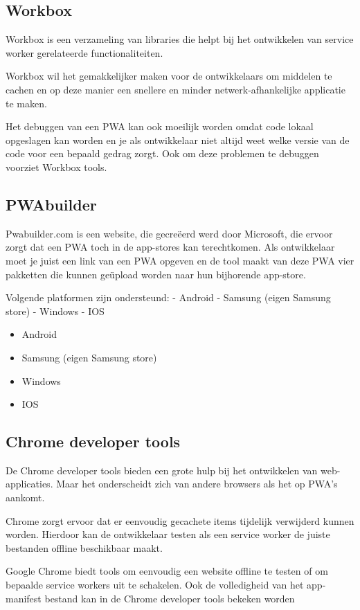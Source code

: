 		

\subsection{Workbox}

	Workbox is een verzameling van libraries die helpt bij het ontwikkelen van service worker gerelateerde functionaliteiten.
	
	Workbox wil het gemakkelijker maken voor de ontwikkelaars om middelen te cachen en op deze manier een snellere en minder netwerk-afhankelijke applicatie te maken.
	
	Het debuggen van een PWA kan ook moeilijk worden omdat code lokaal opgeslagen kan worden en je als ontwikkelaar niet altijd weet welke versie van de code voor een bepaald gedrag zorgt. Ook om deze problemen te debuggen voorziet Workbox tools.
	
	\autocite{Workbox2020}
	

\subsection{PWAbuilder}

	Pwabuilder.com is een website, die gecreëerd werd door Microsoft, die ervoor zorgt dat een PWA toch in de app-stores kan terechtkomen. Als ontwikkelaar moet je juist een link van een PWA opgeven en de tool maakt van deze PWA vier pakketten die kunnen geüpload worden naar hun bijhorende app-store. 
	
	Volgende platformen zijn ondersteund:
	-	Android
	-	Samsung (eigen Samsung store)
	-	Windows
	-	IOS
	
	\begin{itemize}
		\item	Android
		\item	Samsung (eigen Samsung store)
		\item	Windows
		\item	IOS
	\end{itemize}
	\autocite{PWAbuilder2020}
	
	
\subsection{Chrome developer tools}
	De Chrome developer tools bieden een grote hulp bij het ontwikkelen van web-applicaties. Maar het onderscheidt zich van andere browsers als het op PWA’s aankomt. 
	
	Chrome zorgt ervoor dat er eenvoudig gecachete items tijdelijk verwijderd kunnen worden. Hierdoor kan de ontwikkelaar testen als een service worker de juiste bestanden offline beschikbaar maakt.
	
	Google Chrome biedt tools om eenvoudig een website offline te testen of om bepaalde service workers uit te schakelen.
	Ook de volledigheid van het app-manifest bestand kan in de Chrome developer tools bekeken worden
	
	\autocite{Developers2019b}
	

	
	